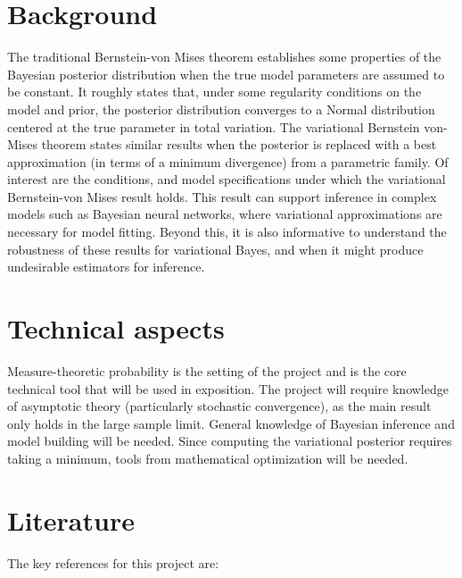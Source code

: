 \documentclass[]{STAT_547C}
\begin{document}
\vspace{-2cm}


\section{Background}

The traditional Bernstein-von Mises theorem establishes some properties of the Bayesian posterior distribution when the true model parameters are assumed to be constant. It roughly states that, under some regularity conditions on the model and prior,  the posterior distribution converges to a Normal distribution centered at the true parameter in total variation. The variational Bernstein von-Mises theorem states similar results when the posterior is replaced with a best approximation (in terms of a minimum divergence) from a parametric family. Of interest are the conditions, and model specifications under which the variational Bernstein-von Mises result holds. This result can support inference in complex models such as Bayesian neural networks, where variational approximations are necessary for model fitting. Beyond this, it is also informative to understand the robustness of these results for variational Bayes, and when it might produce undesirable estimators for inference. 

\section{Technical aspects}

Measure-theoretic probability is the setting of the project and is the core technical tool that will be used in exposition. The project will require knowledge of asymptotic theory (particularly stochastic convergence), as the main result only holds in the large sample limit. General knowledge of Bayesian inference and model building will be needed. Since computing the variational posterior requires taking a minimum, tools from mathematical optimization will be needed.


\section{Literature}

The key references for this project are: 
\end{document}
